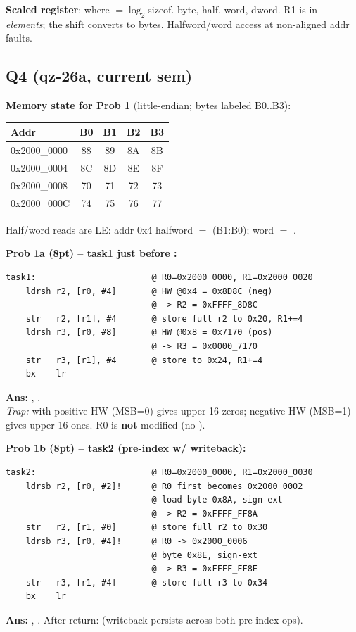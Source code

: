 \textbf{Scaled register}:  where $=\log_2$sizeof.  byte,  half,  word,  dword. R1 is in \emph{elements}; the shift converts to bytes. Halfword/word access at non-aligned addr faults.

\subsection{Q4 (qz-26a, current sem)}
\textbf{Memory state for Prob 1} (little-endian; bytes labeled B0..B3):
\begin{center}\scriptsize
\begin{tabular}{@{}lcccc@{}}
\toprule
Addr & B0 & B1 & B2 & B3 \\
\midrule
0x2000\_0000 & 88 & 89 & 8A & 8B \\
0x2000\_0004 & 8C & 8D & 8E & 8F \\
0x2000\_0008 & 70 & 71 & 72 & 73 \\
0x2000\_000C & 74 & 75 & 76 & 77 \\
\bottomrule
\end{tabular}
\end{center}
Half/word reads are LE: addr 0x4 halfword $=$  (B1:B0); word $=$ .

\begin{qp}\textbf{Prob 1a (8pt) -- task1 just before :}
\begin{lstlisting}
task1:                       @ R0=0x2000_0000, R1=0x2000_0020
    ldrsh r2, [r0, #4]       @ HW @0x4 = 0x8D8C (neg)
                             @ -> R2 = 0xFFFF_8D8C
    str   r2, [r1], #4       @ store full r2 to 0x20, R1+=4
    ldrsh r3, [r0, #8]       @ HW @0x8 = 0x7170 (pos)
                             @ -> R3 = 0x0000_7170
    str   r3, [r1], #4       @ store to 0x24, R1+=4
    bx    lr
\end{lstlisting}
\textbf{Ans:} , .\\
\emph{Trap:}  with positive HW (MSB=0) gives upper-16 zeros; negative HW (MSB=1) gives upper-16 ones. R0 is \textbf{not} modified (no \asm{!}).
\end{qp}

\begin{qp}\textbf{Prob 1b (8pt) -- task2 (pre-index w/ writeback):}
\begin{lstlisting}
task2:                       @ R0=0x2000_0000, R1=0x2000_0030
    ldrsb r2, [r0, #2]!      @ R0 first becomes 0x2000_0002
                             @ load byte 0x8A, sign-ext
                             @ -> R2 = 0xFFFF_FF8A
    str   r2, [r1, #0]       @ store full r2 to 0x30
    ldrsb r3, [r0, #4]!      @ R0 -> 0x2000_0006
                             @ byte 0x8E, sign-ext
                             @ -> R3 = 0xFFFF_FF8E
    str   r3, [r1, #4]       @ store full r3 to 0x34
    bx    lr
\end{lstlisting}
\textbf{Ans:} , .
After return:  (writeback persists across both pre-index ops).
\end{qp}

